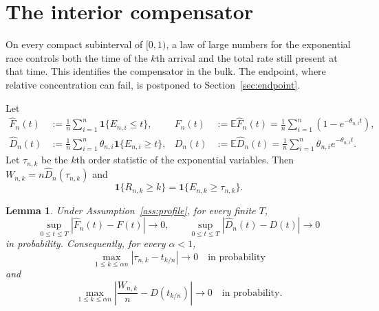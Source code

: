 \documentclass[11pt]{article}
\newtheorem{lemma}[theorem]{Lemma}
\theoremstyle{remark}
\theoremstyle{plain}
\newcommand{\E}{\mathbb E}
\newcommand{\one}{\mathbf 1}
\begin{document}
\section{The interior compensator}

On every compact subinterval of $[0,1)$, a law of large numbers for the
exponential race controls both the time of the $k$th arrival and the total
rate still present at that time.  This identifies the compensator in the
bulk.  The endpoint, where relative concentration can fail, is postponed to
Section~\ref{sec:endpoint}.

Let
\begin{align}
 \widehat F_n(t)&:=\frac1n\sum_{i=1}^n\one\{E_{n,i}\le t\},
 &F_n(t)&:=\E\widehat F_n(t)
 =\frac1n\sum_{i=1}^n(1-e^{-\theta_{n,i}t}),\label{eq:empirical-F}\\
 \widehat D_n(t)&:=\frac1n\sum_{i=1}^n
 \theta_{n,i}\one\{E_{n,i}\ge t\},
 &D_n(t)&:=\E\widehat D_n(t)
 =\frac1n\sum_{i=1}^n\theta_{n,i}e^{-\theta_{n,i}t}.
 \label{eq:empirical-D}
\end{align}
Let $\tau_{n,k}$ be the $k$th order statistic of the exponential variables.
Then $W_{n,k}=n\widehat D_n(\tau_{n,k})$ and
\begin{equation}\label{eq:survival-indicator}
 \one\{R_{n,k}\ge k\}=\one\{E_{n,k}\ge\tau_{n,k}\}.
\end{equation}

\begin{lemma}\label{lem:race-law}
Under Assumption~\ref{ass:profile}, for every finite $T$,
\begin{equation}\label{eq:uniform-race}
 \sup_{0\le t\le T}|\widehat F_n(t)-F(t)|\longrightarrow0,
 \qquad
 \sup_{0\le t\le T}|\widehat D_n(t)-D(t)|\longrightarrow0
\end{equation}
in probability.  Consequently, for every $\alpha<1$,
\begin{equation}\label{eq:uniform-quantile}
 \max_{1\le k\le\alpha n}|\tau_{n,k}-t_{k/n}|\longrightarrow0
 \quad\text{in probability}
\end{equation}
and
\begin{equation}\label{eq:uniform-denominator}
 \max_{1\le k\le\alpha n}
 \left|\frac{W_{n,k}}n-D(t_{k/n})\right|\longrightarrow0
 \quad\text{in probability}.
\end{equation}
\end{lemma}
\end{document}
